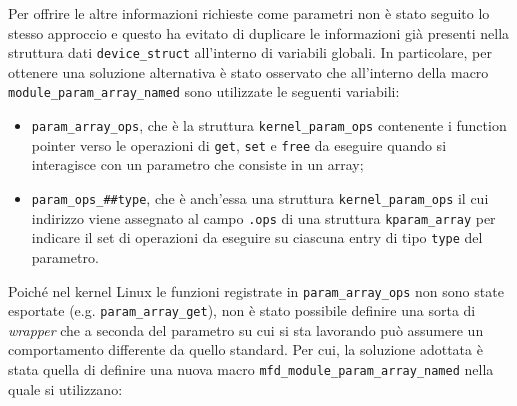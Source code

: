\documentclass{article}
\begin{document}
Per offrire le altre informazioni richieste come parametri non è stato seguito lo stesso approccio e questo ha evitato di duplicare le informazioni già presenti nella struttura dati \texttt{device\_struct} all'interno di variabili globali. In particolare, per ottenere una soluzione alternativa è stato osservato che all'interno della macro \texttt{module\_param\_array\_named} sono utilizzate le seguenti variabili:
\begin{itemize}
\item \texttt{param\_array\_ops}, che è la struttura \texttt{kernel\_param\_ops} contenente i function pointer verso le operazioni di \texttt{get}, \texttt{set} e \texttt{free} da eseguire quando si interagisce con un parametro che consiste in un array;
\item \texttt{param\_ops\_\#\#type}, che è anch'essa una struttura \texttt{kernel\_param\_ops} il cui indirizzo viene assegnato al campo \texttt{.ops} di una struttura \texttt{kparam\_array} per indicare il set di operazioni da eseguire su ciascuna entry di tipo \texttt{type} del parametro.
\end{itemize}
Poiché nel kernel Linux le funzioni registrate in \texttt{param\_array\_ops} non sono state esportate (e.g. \texttt{param\_array\_get}), non è stato possibile definire una sorta di \textsl{wrapper} che a seconda del parametro su cui si sta lavorando può assumere un comportamento differente da quello standard. Per cui, la soluzione adottata è stata quella di definire una nuova macro \texttt{mfd\_module\_param\_array\_named} nella quale si utilizzano:
\end{document}

